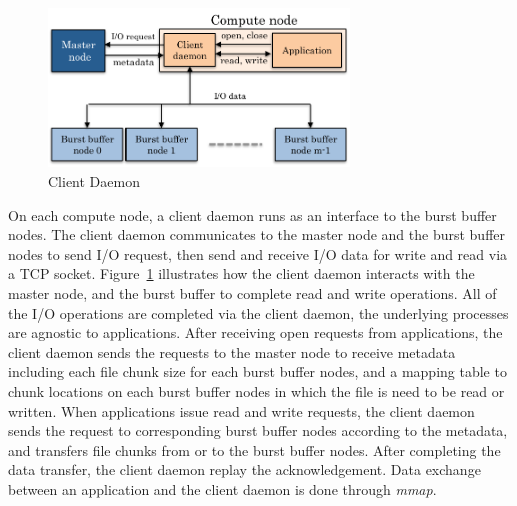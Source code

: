 \begin{figure}[tb]
	\centering
	\includegraphics[width=8cm]{img/client_daemon-2}
	\caption{Client Daemon}
	\label{implementaion:client_daemon}
\end{figure}

On each compute node, a client daemon runs as an interface to the burst buffer
nodes. The client daemon communicates to the master node and the burst buffer
nodes to send I/O request, then send and receive I/O data for write and read
via a TCP socket.
Figure~\ref{implementaion:client_daemon} illustrates how the client daemon
interacts with the master node, and the burst buffer to complete read and write
operations. All of the I/O operations are completed via the client daemon, the
underlying processes are agnostic to applications. 
After receiving open requests from applications, 
the client daemon sends the requests to the master node to receive metadata
including each file chunk size for each burst buffer nodes, and a mapping table
to chunk locations on each burst buffer nodes in which the file is need to be
read or written.
When applications issue read and write requests, the client daemon sends the
request to corresponding burst buffer nodes according to the metadata, 
and transfers file chunks from or to the burst buffer nodes. After
completing the data transfer, the client daemon replay the
acknowledgement.
Data exchange between an application and the client daemon is done through
\emph{mmap}.


